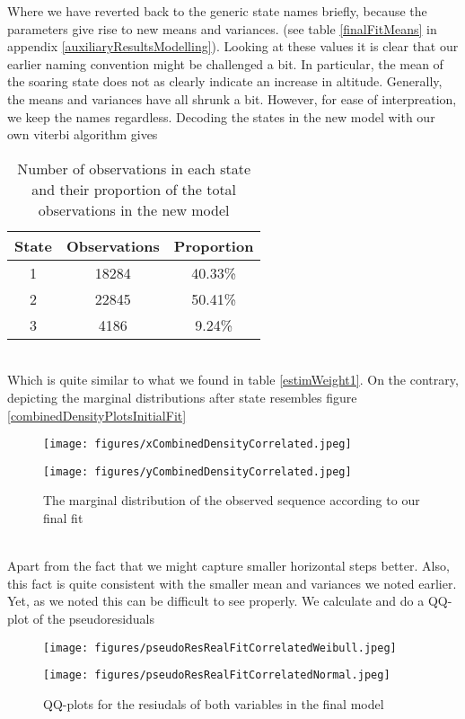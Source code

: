 Where we have reverted back to the generic state names briefly, because the parameters give rise to new means and variances. (see table \ref{finalFitMeans} in appendix \ref{auxiliaryResultsModelling}). Looking at these values it is clear that our earlier naming convention might be challenged a bit. In particular, the mean of the soaring state does not as clearly indicate an increase in altitude.  Generally, the means and variances have all shrunk a bit. However, for ease of interpreation, we keep the names regardless. Decoding the states in the new model with our own viterbi algorithm gives
\begin{table}[ht]
  \centering
  \begin{tabular}{ccc}
      \hline
      \textbf{State} & \textbf{Observations} & \textbf{Proportion} \\
      \hline
      1 & 18284 & 40.33\% \\
      2 & 22845 & 50.41\% \\
      3 & 4186 & 9.24\% \\
      \hline
  \end{tabular}
  \caption{Number of observations in each state and their proportion of the total observations in the new model}
  \label{estimWeight2}
\end{table}\\
Which is quite similar to what we found in table \ref{estimWeight1}. On the contrary, depicting the marginal distributions after state resembles figure \ref{combinedDensityPlotsInitialFit}
\begin{figure}[ht]
  \centering
  \begin{minipage}[b]{0.49\textwidth}
    \texttt{[image: figures/xCombinedDensityCorrelated.jpeg]}
  \end{minipage}
  \hfill
  \begin{minipage}[b]{0.49\textwidth}
    \texttt{[image: figures/yCombinedDensityCorrelated.jpeg]}
  \end{minipage}
  \caption{The marginal distribution of the observed sequence according to our final fit}
  \label{combinedDensityPlotsFinalFit}
\end{figure}\\
Apart from the fact that we might capture smaller horizontal steps better. Also, this fact is quite consistent with the smaller mean and variances we noted earlier. Yet, as we noted this can be difficult to see properly. We calculate and do a QQ-plot of the pseudoresiduals
\begin{figure}[ht]
  \centering
  \begin{minipage}[b]{0.49\textwidth}
    \texttt{[image: figures/pseudoResRealFitCorrelatedWeibull.jpeg]}
  \end{minipage}
  \hfill
  \begin{minipage}[b]{0.49\textwidth}
    \texttt{[image: figures/pseudoResRealFitCorrelatedNormal.jpeg]}
  \end{minipage}
  \caption{QQ-plots for the resiudals of both variables in the final model}
  \label{combinedQQPlotsFinal}
\end{figure}\\
